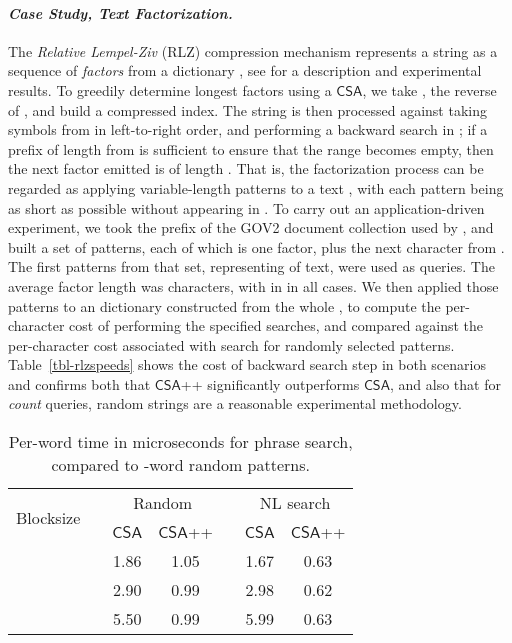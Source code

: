 \documentclass{llncs}
\newcommand{\myparagraph}[1]{\paragraph*{\normalsize\it#1.}}
\newcommand{\CSA}[0]{\ensuremath{\mathsf{CSA}}}
\begin{document}
\myparagraph{Case Study, Text Factorization}


The {\emph{Relative Lempel-Ziv}} (RLZ) compression mechanism
represents a string  as a sequence of {\emph{factors}} from
a dictionary , see {\citet{pmnw15airs}} for a description
and experimental results.
To greedily determine longest factors using a {\CSA}, we take
, the reverse of , and build a
compressed index.
The string is then processed against  taking symbols from
 in left-to-right order, and performing a backward search in
; if a prefix of length  from  is sufficient to
ensure that the  range becomes empty, then the next factor
emitted is of length .
That is, the factorization process can be regarded as applying
variable-length patterns to a text , with each pattern being
as short as possible without appearing in .
To carry out an application-driven experiment, we took the 
prefix of the GOV2 document collection used by
{\citeauthor{pmnw15airs}}, and built a set of patterns, each of which
is one factor, plus the next character from .
The first  patterns from that set, representing
 of text, were used as queries.
The average factor length was  characters, with 
in  in all cases.
We then applied those patterns to an  dictionary 
constructed from the whole , to compute the per-character
cost of performing the specified searches, and compared against the
per-character cost associated with search for randomly selected
patterns.
Table~\ref{tbl-rlzspeeds} shows the cost of backward search step in
both scenarios and confirms both that {\CSA++} significantly
outperforms {\CSA}, and also that for {\emph{count}} queries, random
strings are a reasonable experimental methodology.


\begin{wraptable}{r}{55mm}
\vspace*{-8mm}
\begin{tabular}{c c cc c cc}
\toprule
\multirow{2}{*}{Blocksize}
	&& \multicolumn{2}{c}{Random}
		&& \multicolumn{2}{c}{NL search}
\\
\cmidrule{3-4}\cmidrule{6-7}
	&& \CSA & \CSA++
		&& \CSA & \CSA++
\\
\midrule

	&& 1.86 & 1.05
		&& 1.67 & 0.63
\\

	&& 2.90 & 0.99
		&& 2.98 & 0.62
\\

	&& 5.50 & 0.99
		&& 5.99 & 0.63
\\
\bottomrule
\end{tabular}

 \vspace*{-2mm}
\caption{Per-word time in microseconds for phrase search,
compared to -word random patterns.
\vspace*{-6mm}
\label{tbl-nlspeeds}}
\end{wraptable}
\end{document}
